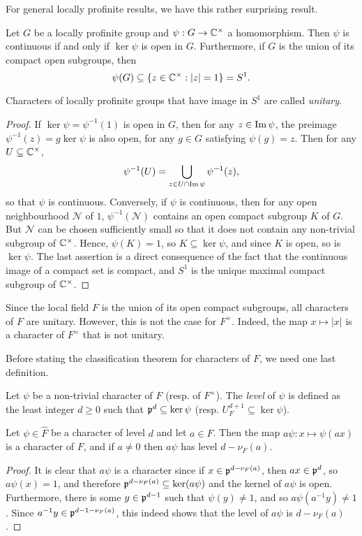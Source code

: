 For general locally profinite results, we have this rather surprising result. 
\begin{lemma}\label{lem_cont_chars}
    Let $G$ be a locally profinite group and $\psi: G\rightarrow\mathbb{C}^{\times}$ a homomorphism. Then $\psi$ is continuous if and only if $\ker\psi$ is open in $G$. Furthermore, if $G$ is the union of its compact open subgroups, then $$\psi(G)\subseteq\{z\in\mathbb{C}^{\times}:|z|=1\}=S^1.$$
\end{lemma}
\begin{rem}
    Characters of locally profinite groups that have image in $S^1$ are called \textit{unitary}.
\end{rem}
\begin{proof}
    If $\ker\psi=\psi^{-1}(1)$ is open in $G$, then for any $z\in\operatorname{Im}\psi$, the preimage $\psi^{-1}(z)=g\ker\psi$ is also open, for any $g \in G$ satisfying $\psi(g)=z$. Then for any $U\subseteq\mathbb{C}^{\times}$, 
    $$\psi^{-1}(U)=\bigcup_{z\in U\cap\operatorname{Im}\psi}\psi^{-1}(z),$$
    so that $\psi$ is continuous.
    Conversely, if $\psi$ is continuous, then for any open neighbourhood $\mathcal{N}$ of $1$, $\psi^{-1}(\mathcal{N})$ contains an open compact subgroup $K$ of $G$. But $\mathcal{N}$ can be chosen sufficiently small so that it does not contain any non-trivial subgroup of $\mathbb{C}^{\times}$. Hence, $\psi(K)=1$, so $K\subseteq\ker\psi$, and since $K$ is open, so is $\ker\psi$.
    The last assertion is a direct consequence of the fact that the continuous image of a compact set is compact, and $S^1$ is the unique maximal compact subgroup of $\mathbb{C}^{\times}$.
\end{proof}


Since the local field $F$ is the union of its open compact subgroups, all characters of $F$ are unitary. However, this is not the case for $F^{\times}$. Indeed, the map $x\mapsto|x|$ is a character of $F^{\times}$ that is not unitary. 

Before stating the classification theorem for characters of $F$, we need one last definition. 

\begin{defn}
    Let $\psi$ be a non-trivial character of $F$ (resp. of $F^{\times}$). The \textit{level} of $\psi$ is defined as the least integer $d\geq0$ such that $\mathfrak{p}^d\subseteq\ker\psi$ (resp. $U_F^{d+1}\subseteq\ker\psi$).
\end{defn}

\begin{lemma}
    Let $\psi\in\hat{F}$ be a character of level $d$ and let $a\in F$. Then the map $a\psi:x\mapsto\psi(ax)$ is a character of $F$, and if $a\neq0$ then $a\psi$ has level $d-\nu_F(a)$.
\end{lemma}
\begin{proof}
    It is clear that $a\psi$ is a character since if $x\in\mathfrak{p}^{d-\nu_F(a)}$, then $ax\in\mathfrak{p}^d$, so $a\psi(x)=1$, and therefore $\mathfrak{p}^{d-\nu_F(a)}\subseteq\ker(a\psi)$ and the kernel of $a\psi$ is open. Furthermore, there is some $y\in\mathfrak{p}^{d-1}$ such that $\psi(y)\neq1$, and so $a\psi(a^{-1}y)\neq1$. Since $a^{-1}y\in\mathfrak{p}^{d-1-\nu_F(a)}$, this indeed shows that the level of $a\psi$ is $d-\nu_F(a)$. 
\end{proof}

